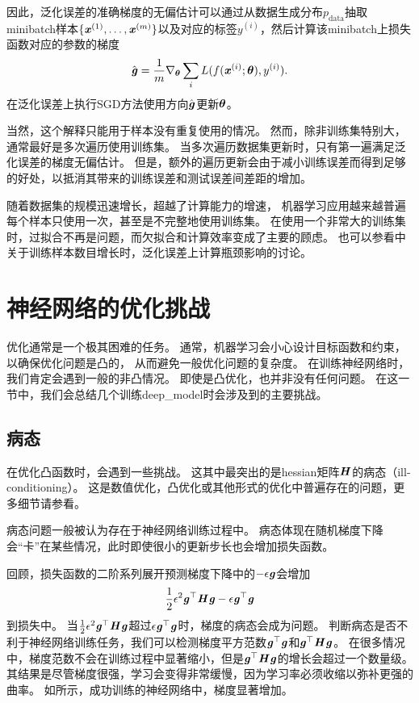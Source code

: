 因此，泛化误差的准确梯度的无偏估计可以通过从数据生成分布$p_\text{data}$抽取\gls{minibatch}样本$\{ \boldsymbol{\mathit{x}}^{(1)}, \dots,\boldsymbol{\mathit{x}}^{(m)} \}$以及对应的标签$y^{(i)}$，然后计算该\gls{minibatch}上损失函数对应的参数的梯度
\begin{equation}
\label{eq:8.9}
    \hat{\boldsymbol{\mathit{g}}} = \frac{1}{m} \nabla_{\boldsymbol{\theta}} \sum_i L(f(\boldsymbol{\mathit{x}}^{(i)};\boldsymbol{\theta}),y^{(i)} ).
\end{equation}
在泛化误差上执行SGD方法使用方向$\hat{\boldsymbol{\mathit{g}}}$更新$\boldsymbol{\theta}$。

当然，这个解释只能用于样本没有重复使用的情况。
然而，除非训练集特别大，通常最好是多次遍历使用训练集。
当多次遍历数据集更新时，只有第一遍满足泛化误差的梯度无偏估计。
但是，额外的遍历更新会由于减小训练误差而得到足够的好处，以抵消其带来的训练误差和测试误差间差距的增加。


随着数据集的规模迅速增长，超越了计算能力的增速，
机器学习应用越来越普遍每个样本只使用一次，甚至是不完整地使用训练集。
在使用一个非常大的训练集时，过拟合不再是问题，而欠拟合和计算效率变成了主要的顾虑。
也可以参看\cite{bottou-bousquet-2008}中关于训练样本数目增长时，泛化误差上计算瓶颈影响的讨论。

\section{神经网络的优化挑战}
\label{sec:challenges_in_neural_network_optimization}
优化通常是一个极其困难的任务。
通常，机器学习会小心设计目标函数和约束，以确保优化问题是凸的，
从而避免一般优化问题的复杂度。
在训练神经网络时，我们肯定会遇到一般的非凸情况。
即使是凸优化，也并非没有任何问题。
在这一节中，我们会总结几个训练\gls{deep_model}时会涉及到的主要挑战。

\subsection{病态}
\label{sec:ill_conditioning}
在优化凸函数时，会遇到一些挑战。
这其中最突出的是\gls{hessian}矩阵$\boldsymbol{\mathit{H}}$的病态（ill-conditioning）。
这是数值优化，凸优化或其他形式的优化中普遍存在的问题，更多细节请参看。

病态问题一般被认为存在于神经网络训练过程中。
病态体现在随机梯度下降会``卡''在某些情况，此时即使很小的更新步长也会增加损失函数。

回顾，损失函数的二阶系列展开预测梯度下降中的$-\epsilon\boldsymbol{\mathit{g}}$会增加
\begin{equation}
    \frac{1}{2} \epsilon^2 \boldsymbol{\mathit{g}}^\top \boldsymbol{\mathit{H}}\boldsymbol{\mathit{g}} - \epsilon\boldsymbol{\mathit{g}}^\top\boldsymbol{\mathit{g}}
\end{equation}
到损失中。
当$\frac{1}{2} \epsilon^2 \boldsymbol{\mathit{g}}^\top\boldsymbol{\mathit{H}}\boldsymbol{\mathit{g}}$超过$\epsilon\boldsymbol{\mathit{g}}^\top\boldsymbol{\mathit{g}}$时，梯度的病态会成为问题。
判断病态是否不利于神经网络训练任务，我们可以检测梯度平方范数$\boldsymbol{\mathit{g}}^\top\boldsymbol{\mathit{g}}$和$\boldsymbol{\mathit{g}}^\top \boldsymbol{\mathit{H}}\boldsymbol{\mathit{g}}$。
在很多情况中，梯度范数不会在训练过程中显著缩小，但是$\boldsymbol{\mathit{g}}^\top\boldsymbol{\mathit{H}}\boldsymbol{\mathit{g}}$的增长会超过一个数量级。
其结果是尽管梯度很强，学习会变得非常缓慢，因为学习率必须收缩以弥补更强的曲率。
如所示，成功训练的神经网络中，梯度显著增加。

